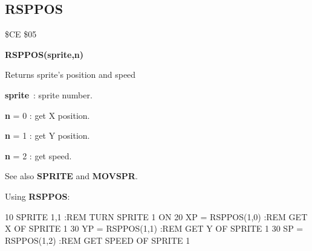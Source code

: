 
\newpage
\subsection{RSPPOS}
\begin{description}[leftmargin=3cm,style=nextline]
\item [Token:] \$CE \$05
\item [Format:] {\bf RSPPOS(sprite,n)} \\
\item [Usage:]  Returns sprite's position and speed

                {\bf sprite} : sprite number.

                {\bf n} = 0 : get X position.

                {\bf n} = 1 : get Y position.

                {\bf n} = 2 : get speed.


\item [Remarks:] See also {\bf SPRITE} and {\bf MOVSPR}.

\item [Example:] Using {\bf RSPPOS}:
\begin{screenoutput}
 10 SPRITE 1,1         :REM TURN SPRITE 1 ON
 20 XP = RSPPOS(1,0)   :REM GET X OF SPRITE 1
 30 YP = RSPPOS(1,1)   :REM GET Y OF SPRITE 1
 30 SP = RSPPOS(1,2)   :REM GET SPEED OF SPRITE 1
\end{screenoutput}
\end{description}


\newpage
